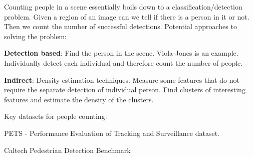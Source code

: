 \documentclass[8pt]{extarticle}
\begin{document}
\begin{multicols}{2}
Counting people in a scene essentially boils down to a classification/detection problem. Given a region of an image can we tell if there is a person in it or not. Then we count the number of successful detections. Potential approaches to solving the problem:

\begin{compactitem}
    \item \textbf{Detection based}: Find the person in the scene. Viola-Jones is an example. Individually detect each individual and therefore count the number of people. \cite{viola2004robust}
    \item \textbf{Indirect}: Density estimation techniques. Measure some features that do not require the separate detection of individual person. Find clusters of interesting features and estimate the density of the clusters. \cite{conte2010method}
\end{compactitem}

Key datasets for people counting:
\begin{compactitem}
    \item PETS - Performance Evaluation of Tracking and Surveillance dataset.
    \item Caltech Pedestrian Detection Benchmark
\end{compactitem}



\end{multicols}
\end{document}
